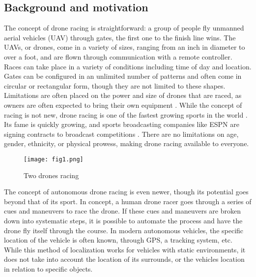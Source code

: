 \documentclass[onecolumn,10pt]{IEEEtran}
\begin{document}
\subsection{Background and motivation}
    The concept of drone racing is straightforward: a group of people fly unmanned aerial vehicles (UAV) through gates, the first one to the finish line wins. The UAVs, or drones, come in a variety of sizes, ranging from an inch in diameter to over a foot, and are flown through communication with a remote controller. Races can take place in a variety of conditions including time of day and location. Gates can be configured in an unlimited number of patterns and often come in circular or rectangular form, though they are not limited to these shapes. Limitations are often placed on the power and size of drones that are raced, as owners are often expected to bring their own equipment \cite{redbull2018drone}. While the concept of racing is not new, drone racing is one of the fastest growing sports in the world \cite{condliffe2016is}. Its fame is quickly growing, and sports broadcasting companies like ESPN are signing contracts to broadcast competitions \cite{marshall2017espn}. There are no limitations on age, gender, ethnicity, or physical prowess, making drone racing available to everyone.
\begin{figure}[hb]
\begin{center}
\texttt{[image: fig1.png]}
\end{center}
\caption{Two drones racing}
\label{fig:1}
\end{figure}

The concept of autonomous drone racing is even newer, though its potential goes beyond that of its sport. In concept, a human drone racer goes through a series of cues and maneuvers to race the drone. If these cues and maneuvers are broken down into systematic steps, it is possible to automate the process and have the drone fly itself through the course. In modern autonomous vehicles, the specific location of the vehicle is often known, through GPS, a tracking system, etc. While this method of localization works for vehicles with static environments, it does not take into account the location of its surrounds, or the vehicles location in relation to specific objects. 
\end{document}

